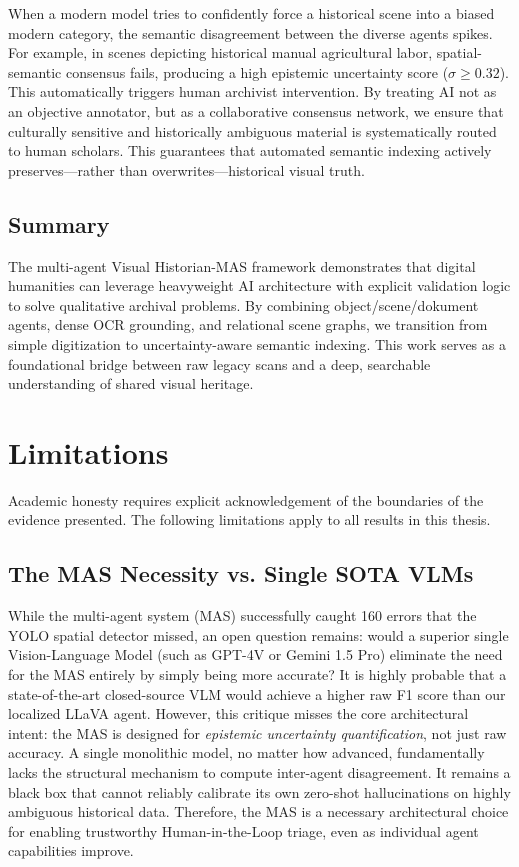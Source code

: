 \documentclass[12pt,onecolumn,a4paper]{IEEEtran}
\begin{document}
When a modern model tries to confidently force a historical scene into a biased modern category, the semantic disagreement between the diverse agents spikes. For example, in scenes depicting historical manual agricultural labor, spatial-semantic consensus fails, producing a high epistemic uncertainty score ($\sigma \ge 0.32$). This automatically triggers human archivist intervention. By treating AI not as an objective annotator, but as a collaborative consensus network, we ensure that culturally sensitive and historically ambiguous material is systematically routed to human scholars. This guarantees that automated semantic indexing actively preserves---rather than overwrites---historical visual truth.


\subsection{Summary}
The multi-agent Visual Historian-MAS framework demonstrates that digital humanities can leverage heavyweight AI architecture with explicit validation logic to solve qualitative archival problems. By combining object/scene/dokument agents, dense OCR grounding, and relational scene graphs, we transition from simple digitization to uncertainty-aware semantic indexing. This work serves as a foundational bridge between raw legacy scans and a deep, searchable understanding of shared visual heritage.

\clearpage
\section{Limitations}
\label{sec:limitations}

Academic honesty requires explicit acknowledgement of the boundaries of the evidence presented. The following limitations apply to all results in this thesis.

\subsection{The MAS Necessity vs. Single SOTA VLMs}
While the multi-agent system (MAS) successfully caught 160 errors that the YOLO spatial detector missed, an open question remains: would a superior single Vision-Language Model (such as GPT-4V or Gemini 1.5 Pro) eliminate the need for the MAS entirely by simply being more accurate? It is highly probable that a state-of-the-art closed-source VLM would achieve a higher raw F1 score than our localized LLaVA agent. However, this critique misses the core architectural intent: the MAS is designed for \textit{epistemic uncertainty quantification}, not just raw accuracy. A single monolithic model, no matter how advanced, fundamentally lacks the structural mechanism to compute inter-agent disagreement. It remains a black box that cannot reliably calibrate its own zero-shot hallucinations on highly ambiguous historical data. Therefore, the MAS is a necessary architectural choice for enabling trustworthy Human-in-the-Loop triage, even as individual agent capabilities improve.
\end{document}
